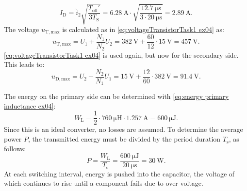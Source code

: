 \begin{solutionblock}
    \begin{equation}
        I_\mathrm{D} = \hat i_\mathrm{2} \sqrt{\frac{T_\mathrm{off}'}{3T_\mathrm{S}}}= \SI{6.28}{\ampere}\cdot\sqrt{\frac{\SI{12.7}{\micro\s}}{3\cdot\SI{20}{\micro\s}}}= \SI{2.89}{\ampere}.
    \end{equation}
    The voltage  $u_\mathrm{T,max}$ is calculated as in \eqref{eq:voltageTransistorTask1 ex04} as:
    \begin{equation}
        u_\mathrm{T,max} = U_\mathrm{1} + \frac{N_\mathrm{1}}{N_\mathrm{2}}U_\mathrm{2}= \SI{382}{\volt}+\frac{60}{12}\cdot\SI{15}{\volt}= \SI{457}{\volt}.
    \end{equation}
    \eqref{eq:voltageTransistorTask1 ex04} is used again, but now for the secondary side. This leads to:
    \begin{equation}
        u_\mathrm{D,max} = U_\mathrm{2} + \frac{N_\mathrm{2}}{N_\mathrm{1}}U_\mathrm{1}= \SI{15}{\volt}+\frac{12}{60}\cdot\SI{382}{\volt}= \SI{91.4}{\volt}.
    \end{equation}

\end{solutionblock}


\begin{solutionblock}
    The energy on the primary side can be determined with \eqref{eq:energy primary inductance ex04}:
    \begin{equation}
        W_\mathrm{L} = \frac{1}{2}\cdot \SI{760}{\micro\henry} \cdot \SI{1.257}{\ampere} = \SI{600}{\micro\joule}.
    \end{equation}
    Since this is an ideal converter, no losses are assumed. 
    To determine the average power ${P}$, the transmitted energy must be divided by the period duration $T_\mathrm{s}$, as follows:
    \begin{equation}
        {P} = \frac{W_\mathrm{L}}{T_\mathrm{s}} = \frac{\SI{600}{\micro\joule}}{\SI{20}{\micro\s}}=\SI{30}{\watt}.
    \end{equation}
At each switching interval, energy is pushed into the capacitor, the voltage of which continues to rise until a component fails due to over voltage.
\end{solutionblock}

